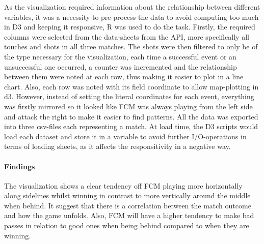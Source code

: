 \documentclass[Report.tex]{subfiles}
\begin{document}
As the visualization required information about the relationship between different variables, it was a necessity to pre-process the data to avoid computing too much in D3 and keeping it responsive, R was used to do the task. Firstly, the required columns were selected from the data-sheets from the API, more specifically all touches and shots in all three matches. The shots were then filtered to only be of the type necessary for the visualization, each time a successful event or an unsuccessful one occurred, a counter was incremented and the relationship between them were noted at each row, thus making it easier to plot in a line chart. Also, each row was noted with its field coordinate to allow map-plotting in d3. However, instead of setting the literal coordinates for each event, everything was firstly mirrored so it looked like FCM was always playing from the left side and attack the right to make it easier to find patterns. All the data was exported into three csv-files each representing a match. At load time, the D3 scripts would load each dataset and store it in a variable to avoid further I/O-operations in terms of loading sheets, as it affects the responsitivity in a negative way. 

\paragraph{Findings \\}
The visualization shows a clear tendency off FCM playing more horizontally along sidelines whilst winning in contrast to more vertically around the middle when behind. It suggest that there is a correlation between the match outcome and how the game unfolds. Also, FCM will have a higher tendency to make bad passes in relation to good ones when being behind compared to when they are winning.
	
\end{document}
